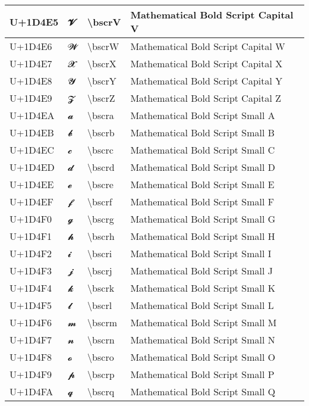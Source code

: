\begin{table}[h]
\begin{tabulary}{\linewidth}{|L|L|L|L|}
\hline
U+1D4E5 & 𝓥 & {\textbackslash}bscrV & Mathematical Bold Script Capital V \\
\hline
U+1D4E6 & 𝓦 & {\textbackslash}bscrW & Mathematical Bold Script Capital W \\
\hline
U+1D4E7 & 𝓧 & {\textbackslash}bscrX & Mathematical Bold Script Capital X \\
\hline
U+1D4E8 & 𝓨 & {\textbackslash}bscrY & Mathematical Bold Script Capital Y \\
\hline
U+1D4E9 & 𝓩 & {\textbackslash}bscrZ & Mathematical Bold Script Capital Z \\
\hline
U+1D4EA & 𝓪 & {\textbackslash}bscra & Mathematical Bold Script Small A \\
\hline
U+1D4EB & 𝓫 & {\textbackslash}bscrb & Mathematical Bold Script Small B \\
\hline
U+1D4EC & 𝓬 & {\textbackslash}bscrc & Mathematical Bold Script Small C \\
\hline
U+1D4ED & 𝓭 & {\textbackslash}bscrd & Mathematical Bold Script Small D \\
\hline
U+1D4EE & 𝓮 & {\textbackslash}bscre & Mathematical Bold Script Small E \\
\hline
U+1D4EF & 𝓯 & {\textbackslash}bscrf & Mathematical Bold Script Small F \\
\hline
U+1D4F0 & 𝓰 & {\textbackslash}bscrg & Mathematical Bold Script Small G \\
\hline
U+1D4F1 & 𝓱 & {\textbackslash}bscrh & Mathematical Bold Script Small H \\
\hline
U+1D4F2 & 𝓲 & {\textbackslash}bscri & Mathematical Bold Script Small I \\
\hline
U+1D4F3 & 𝓳 & {\textbackslash}bscrj & Mathematical Bold Script Small J \\
\hline
U+1D4F4 & 𝓴 & {\textbackslash}bscrk & Mathematical Bold Script Small K \\
\hline
U+1D4F5 & 𝓵 & {\textbackslash}bscrl & Mathematical Bold Script Small L \\
\hline
U+1D4F6 & 𝓶 & {\textbackslash}bscrm & Mathematical Bold Script Small M \\
\hline
U+1D4F7 & 𝓷 & {\textbackslash}bscrn & Mathematical Bold Script Small N \\
\hline
U+1D4F8 & 𝓸 & {\textbackslash}bscro & Mathematical Bold Script Small O \\
\hline
U+1D4F9 & 𝓹 & {\textbackslash}bscrp & Mathematical Bold Script Small P \\
\hline
U+1D4FA & 𝓺 & {\textbackslash}bscrq & Mathematical Bold Script Small Q \\

\end{tabulary}
\end{table}
